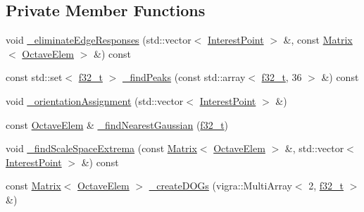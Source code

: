 \subsection*{Private Member Functions}
\begin{DoxyCompactItemize}
\item 
void \hyperlink{classsift_1_1Sift_aafccbb67a8e541bdd6219325d2234d27}{\+\_\+eliminate\+Edge\+Responses} (std\+::vector$<$ \hyperlink{classsift_1_1InterestPoint}{Interest\+Point} $>$ \&, const \hyperlink{classsift_1_1Matrix}{Matrix}$<$ \hyperlink{classsift_1_1OctaveElem}{Octave\+Elem} $>$ \&) const 
\item 
const std\+::set$<$ \hyperlink{types_8hpp_a37279f6a792de218cef11dff445d532a}{f32\+\_\+t} $>$ \hyperlink{classsift_1_1Sift_a982fd0b562f9c648d14e7f373d2a07ae}{\+\_\+find\+Peaks} (const std\+::array$<$ \hyperlink{types_8hpp_a37279f6a792de218cef11dff445d532a}{f32\+\_\+t}, 36 $>$ \&) const 
\item 
void \hyperlink{classsift_1_1Sift_a692af8b13be66a3cea929035d2717b72}{\+\_\+orientation\+Assignment} (std\+::vector$<$ \hyperlink{classsift_1_1InterestPoint}{Interest\+Point} $>$ \&)
\item 
const \hyperlink{classsift_1_1OctaveElem}{Octave\+Elem} \& \hyperlink{classsift_1_1Sift_a72562c5d59baf166d32def09b92bd41f}{\+\_\+find\+Nearest\+Gaussian} (\hyperlink{types_8hpp_a37279f6a792de218cef11dff445d532a}{f32\+\_\+t})
\item 
void \hyperlink{classsift_1_1Sift_aecb428dabc93fec06f5a44058fa5e62a}{\+\_\+find\+Scale\+Space\+Extrema} (const \hyperlink{classsift_1_1Matrix}{Matrix}$<$ \hyperlink{classsift_1_1OctaveElem}{Octave\+Elem} $>$ \&, std\+::vector$<$ \hyperlink{classsift_1_1InterestPoint}{Interest\+Point} $>$ \&) const 
\item 
const \hyperlink{classsift_1_1Matrix}{Matrix}$<$ \hyperlink{classsift_1_1OctaveElem}{Octave\+Elem} $>$ \hyperlink{classsift_1_1Sift_aa7212080cba809a25cad7ef625febf7a}{\+\_\+create\+D\+O\+Gs} (vigra\+::\+Multi\+Array$<$ 2, \hyperlink{types_8hpp_a37279f6a792de218cef11dff445d532a}{f32\+\_\+t} $>$ \&)
\end{DoxyCompactItemize}
